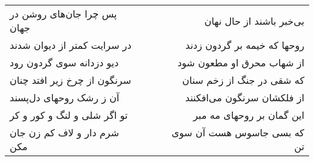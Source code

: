 \begin{center}
\begin{longtable}{l p{0.5cm} r}
پس چرا جان‌های روشن در جهان
&&
بی‌خبر باشند از حال نهان
\\
در سرایت کمتر از دیوان شدند
&&
روحها که خیمه بر گردون زدند
\\
دیو دزدانه سوی گردون رود
&&
از شهاب محرق او مطعون شود
\\
سرنگون از چرخ زیر افتد چنان
&&
که شقی در جنگ از زخم سنان
\\
آن ز رشک روحهای دل‌پسند
&&
از فلکشان سرنگون می‌افکنند
\\
تو اگر شلی و لنگ و کور و کر
&&
این گمان بر روحهای مه مبر
\\
شرم دار و لاف کم زن جان مکن
&&
که بسی جاسوس هست آن سوی تن
\\
\end{longtable}
\end{center}
